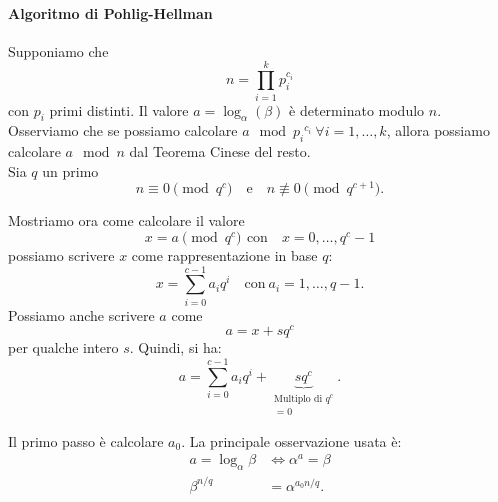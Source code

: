 
\paragraph{Algoritmo di Pohlig-Hellman} Supponiamo che \[
    n= \prod_{i=1}^{k}p_i^{c_i}
\]
 con $p_i$ primi distinti. Il valore $a=\log_{\alpha}(\beta)$ è determinato modulo $n$. Osserviamo che se possiamo calcolare $a \mod{ {p_i}^{c_i}} \ \forall i=1,\dots,k$, allora possiamo calcolare $a \mod n$ dal Teorema Cinese del resto.  \\ Sia $q$ un primo
\[
    n \equiv 0\pmod {q^c} \quad \text{e} \quad n \not \equiv 0 \pmod {q^{c+1}}.
\]

\noindent Mostriamo ora come calcolare il valore 
\[
x=a \pmod {q^c} \, \ \text{con} \quad  x=0,\dots, q^c-1
\]
possiamo scrivere $x$ come rappresentazione in base $q$: 
\[ 
x= \sum_{i=0}^{c-1} a_iq^i \quad \text{con} \ a_i=1, \dots, q-1.
\]
Possiamo anche scrivere $a$ come 
\[
a=x+sq^c 
\] per qualche intero $s$. Quindi, si ha: 
\[
a=\sum_{i=0}^{c-1}a_iq^i+   \underbrace{sq^c}_{\substack{\text{Multiplo di }q^c\\
= 0}
}. 
\]

\noindent Il primo passo è calcolare $a_0$. 
\noindent La principale osservazione usata è: 
\begin{align}
    a=\log_{\alpha}\beta &\iff \alpha^a=\beta  \\
    \beta^{n/q}&=\alpha^{a_0n/q}. \label{osservazione}
\end{align}


